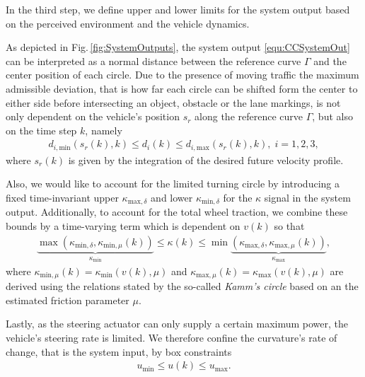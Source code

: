 In the third step, we define upper and lower limits for the system output based on the perceived environment and the vehicle dynamics. 

As depicted in Fig.\,\ref{fig:SystemOutputs}, the system output \eqref{equ:CCSystemOut} can be interpreted as a normal distance between the reference curve $\Gamma$ and the center position of each circle. 
Due to the presence of moving traffic the maximum admissible deviation, that is how far each circle can be shifted form the center to either side before intersecting an object, obstacle or the lane markings, is not only dependent on the vehicle's position $s_r$ along the reference curve $\Gamma$, but also on the time step $k$, namely \begin{align}
	d_{i,\text{min}}\left(s_r(k),k\right) \leq d_i(k) \leq d_{i,\text{max}}\left(s_r(k),k\right), \; i = 1,2,3,
	\label{equ:ColAvoiConstraint}
\end{align}
where $s_r(k)$ is given by the integration of the desired future velocity profile.


Also, we would like to account for the limited turning circle by introducing a fixed time-invariant upper $\kappa_{\text{max},\delta}$ and lower $\kappa_{\text{min},\delta}$ for the $\kappa$ signal in the system output. Additionally, to account for the total wheel traction, we combine these bounds by a time-varying term which is dependent on $v(k)$ so that
\begin{align*}
	\underbrace{\max \left(\kappa_{\text{min},\delta},\kappa_{\text{min},\mu}(k)\right)}_{\kappa_{\text{min}}} \leq \kappa(k) \leq \min \underbrace{\left(\kappa_{\text{max},\delta},\kappa_{\text{max},\mu}(k)\right)}_{\kappa_{\text{max}}},
\end{align*}
where $\kappa_{\text{min},\mu}(k) = \kappa_{\text{min}}\left(v(k),\mu\right)$ and $\kappa_{\text{max},\mu}(k) = \kappa_{\text{max}}\left(v(k),\mu\right)$ are derived using the relations stated by the so-called \emph{Kamm's circle} based on an the estimated friction parameter $\mu$.

Lastly, as the steering actuator can only supply a certain maximum power, the vehicle's steering rate is limited. We therefore confine the curvature's rate of change, that is the system input, by box constraints
\begin{align}
	u_{\text{min}} \leq u(k) \leq u_{\text{max}}.
	\label{equ:InputConstraint}
\end{align}

